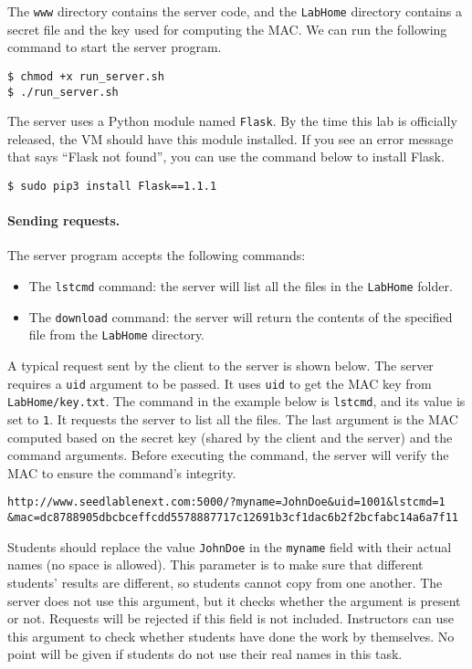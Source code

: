 The \texttt{www} directory contains the server code, and the 
\texttt{LabHome} directory contains a secret file and 
the key used for computing the MAC. We 
can run the following command to start the server program.

\begin{lstlisting}
$ chmod +x run_server.sh
$ ./run_server.sh
\end{lstlisting}

The server uses a Python module named \texttt{Flask}. By the time this lab is
officially released, the VM should have this module installed. 
If you see an error message that says ``Flask not found'',
you can use the command below to install Flask. 

\begin{lstlisting}
$ sudo pip3 install Flask==1.1.1
\end{lstlisting}


\paragraph{Sending requests.} The server program accepts the following commands:

\begin{itemize}
\item The \texttt{lstcmd} command: the server will list all the files in the
\texttt{LabHome} folder.
\item The \texttt{download} command: the server will return the contents of the 
specified file from the \texttt{LabHome} directory.
\end{itemize}

A typical request sent by the client to the server is shown below. 
The server requires a \texttt{uid} argument to be passed. It uses 
\texttt{uid} to get the MAC key from 
\texttt{LabHome/key.txt}. The command 
in the example below is \texttt{lstcmd}, and its value is set to \texttt{1}. It requests
the server to list all the files. The last argument is the MAC computed based on the 
secret key (shared by the client and the server) and the command arguments.
Before executing the command, the server will verify the MAC to ensure
the command's integrity. 

\begin{lstlisting}
http://www.seedlablenext.com:5000/?myname=JohnDoe&uid=1001&lstcmd=1
&mac=dc8788905dbcbceffcdd5578887717c12691b3cf1dac6b2f2bcfabc14a6a7f11
\end{lstlisting}


Students should replace the value \texttt{JohnDoe} in the 
\texttt{myname} field with their actual names (no space 
is allowed). This parameter is to make sure that different students'
results are different, so students cannot copy from one
another. The server does not use this argument, but it checks 
whether the argument is present or not. Requests will be rejected
if this field is not included. 
Instructors
can use this argument to check whether students have done the work by
themselves. No point will be given if students do not use
their real names in this task.



